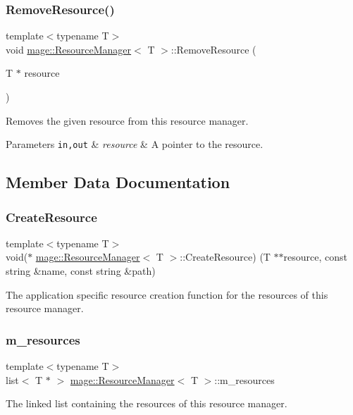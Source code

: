 \subsubsection{\texorpdfstring{Remove\+Resource()}{RemoveResource()}}
{\footnotesize\ttfamily template$<$typename T$>$ \\
void \hyperlink{classmage_1_1_resource_manager}{mage\+::\+Resource\+Manager}$<$ T $>$\+::Remove\+Resource (\begin{DoxyParamCaption}\item[{T $\ast$}]{resource }\end{DoxyParamCaption})}

Removes the given resource from this resource manager.


\begin{DoxyParams}[1]{Parameters}
\mbox{\tt in,out}  & {\em resource} & A pointer to the resource. \\
\hline
\end{DoxyParams}


\subsection{Member Data Documentation}
\hypertarget{classmage_1_1_resource_manager_a1175cdd82a5407dd099b53a432ca9a95}{}\label{classmage_1_1_resource_manager_a1175cdd82a5407dd099b53a432ca9a95} 
\subsubsection{\texorpdfstring{Create\+Resource}{CreateResource}}
{\footnotesize\ttfamily template$<$typename T$>$ \\
void($\ast$ \hyperlink{classmage_1_1_resource_manager}{mage\+::\+Resource\+Manager}$<$ T $>$\+::Create\+Resource) (T $\ast$$\ast$resource, const string \&name, const string \&path)\hspace{0.3cm}{\ttfamily [private]}}

The application specific resource creation function for the resources of this resource manager. \hypertarget{classmage_1_1_resource_manager_ab058f7127d317bfe78b9f391a4351315}{}\label{classmage_1_1_resource_manager_ab058f7127d317bfe78b9f391a4351315} 
\subsubsection{\texorpdfstring{m\+\_\+resources}{m\_resources}}
{\footnotesize\ttfamily template$<$typename T$>$ \\
list$<$ T $\ast$ $>$ \hyperlink{classmage_1_1_resource_manager}{mage\+::\+Resource\+Manager}$<$ T $>$\+::m\+\_\+resources\hspace{0.3cm}{\ttfamily [private]}}

The linked list containing the resources of this resource manager. 